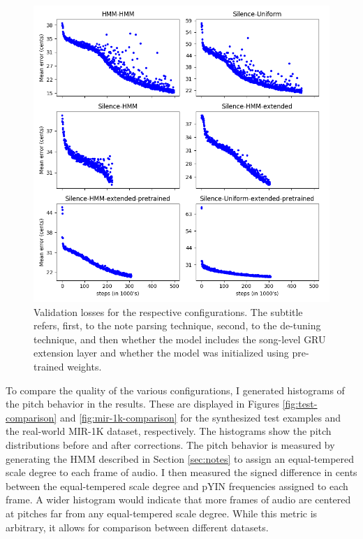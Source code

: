 \begin{figure}[t]
    \centering
    \includegraphics[width=\columnwidth]{figures/losses_plots.png}
    \caption{Validation losses for the respective configurations. The subtitle refers, first, to the note parsing technique, second, to the de-tuning technique, and then whether the model includes the song-level GRU extension layer and whether the model was initialized using pre-trained weights.}
    \label{fig:losses_plots}
\end{figure}

To compare the quality of the various configurations, I generated histograms of the pitch behavior in the results. These are displayed in Figures \ref{fig:test-comparison} and \ref{fig:mir-1k-comparison} for the synthesized test examples and the real-world MIR-1K dataset, respectively. The histograms show the pitch distributions before and after corrections. The pitch behavior is measured by generating the HMM described in Section \ref{sec:notes} to assign an equal-tempered scale degree to each frame of audio. I then measured the signed difference in cents between the equal-tempered scale degree and pYIN frequencies assigned to each frame. A wider histogram would indicate that more frames of audio are centered at pitches far from any equal-tempered scale degree. While this metric is arbitrary, it allows for comparison between different datasets.

